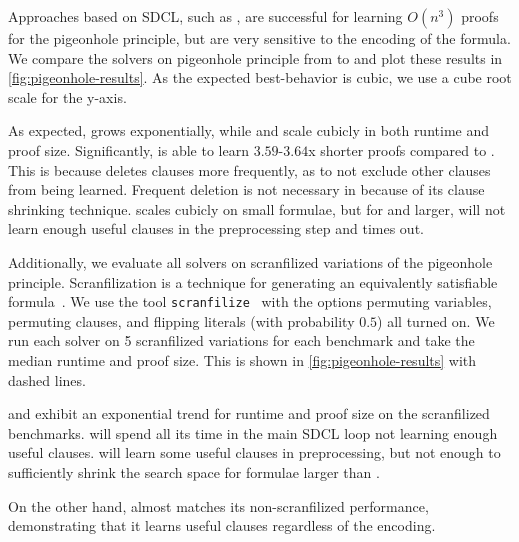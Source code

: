 Approaches based on SDCL, such as \sadical, are successful for learning $O(n^3)$ proofs for the pigeonhole
principle, but are very sensitive to the encoding of the formula. We compare the solvers on
pigeonhole principle from  to  and plot these results in \autoref{fig:pigeonhole-results}. As the expected best-behavior is cubic, we use a cube root scale for the y-axis.

As expected, \cadical grows exponentially, while \sadical and \tool scale cubicly in both runtime and proof size. Significantly, \tool is able to learn $3.59$-$3.64$x shorter proofs compared to \sadical. 
This is because \sadical deletes clauses more frequently, as to not exclude other clauses from being learned. Frequent deletion is not necessary in \tool because of its clause shrinking technique.
\prelearn scales cubicly on small formulae, but for  and larger, will not learn enough useful \pr clauses in the preprocessing step and times out.


Additionally, we evaluate all solvers on scranfilized variations of the
pigeonhole principle. Scranfilization is a technique for generating an
equivalently satisfiable formula~\cite{scranfilize}. We use the tool
\texttt{scranfilize}~\cite{scranfilize} with the options permuting variables, permuting clauses, and flipping literals (with probability $0.5$) all turned on. We run each solver on 5 scranfilized variations for
each benchmark and take the median runtime and proof size. This is shown in \autoref{fig:pigeonhole-results} with dashed lines.

\sadical and \prelearn exhibit an exponential trend for runtime and proof size on the scranfilized benchmarks. \sadical will spend all its time in the main SDCL loop not learning enough useful clauses. \prelearn will learn some useful \pr clauses in preprocessing, but not enough to sufficiently shrink the search space for formulae larger than .

On the other hand, \tool almost matches its non-scranfilized performance, demonstrating that it learns useful \pr clauses regardless of the encoding.




